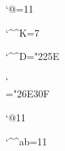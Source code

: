 
\catcode`@=11

\catcode`\^^K=7

\mathcode`\^^D="225E

\delcode`\\="26E30F


\catcode`@11

\catcode`\^^ab=11
